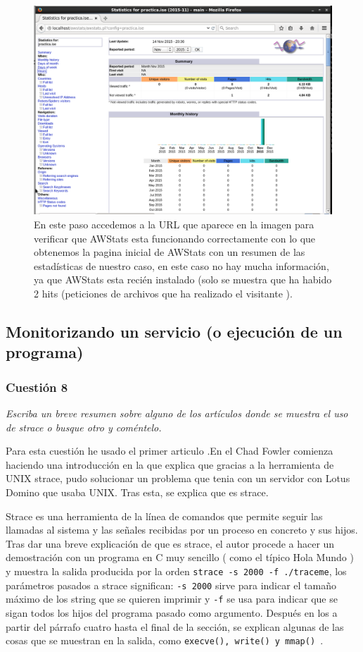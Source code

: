 \begin{figure}[H]
  \begin{center}
    \includegraphics[width=1\textwidth]{imagenes/aw7}
    \caption{En este paso accedemos a la URL que aparece en la imagen para verificar que AWStats esta funcionando correctamente con lo que obtenemos la pagina inicial de AWStats con un resumen de las estadísticas de nuestro caso, en este caso no hay mucha información, ya que AWStats esta recién instalado (solo se muestra que ha habido 2 hits (peticiones de archivos que ha realizado el visitante \cite{aws2}).}
    \label{fig48}
  \end{center}
\end{figure}
\subsection{Monitorizando un servicio (o ejecución de un programa)}
\subsubsection{Cuestión 8}
\textit{Escriba un breve resumen sobre alguno de los artículos donde se muestra el uso de strace o busque otro y coméntelo.}
\newline

Para esta cuestión he usado el primer articulo \cite{fw}.En el Chad Fowler comienza haciendo una introducción en la que explica que gracias a la herramienta de UNIX strace, pudo solucionar un problema que tenia con un servidor con Lotus Domino que usaba UNIX. Tras esta, se explica que es strace. 


Strace es una herramienta de la línea de comandos que permite seguir las llamadas al sistema y las señales recibidas por un proceso en concreto y sus hijos. Tras dar una breve explicación de que es strace, el autor procede a hacer un demostración con un programa en C muy sencillo ( como el típico Hola Mundo ) y muestra la salida producida por la orden \texttt{strace -s 2000 -f ./traceme}, los parámetros pasados a strace significan: \texttt{-s 2000} sirve para indicar el tamaño máximo de los string que se quieren imprimir y \texttt{-f} se usa para indicar que se sigan todos los hijos del programa pasado como argumento. Después en los a partir del párrafo cuatro hasta el final de la sección, se explican algunas de las cosas que se muestran en la salida, como \texttt{execve(), write() y mmap() }.

